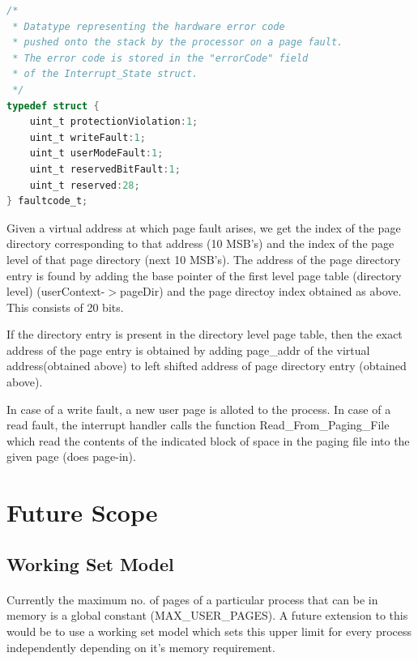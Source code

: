 \documentclass[11pt]{article}
\begin{document}
\begin{lstlisting}[language=c]
/*
 * Datatype representing the hardware error code
 * pushed onto the stack by the processor on a page fault.
 * The error code is stored in the "errorCode" field
 * of the Interrupt_State struct.
 */
typedef struct {
    uint_t protectionViolation:1;
    uint_t writeFault:1;
    uint_t userModeFault:1;
    uint_t reservedBitFault:1;
    uint_t reserved:28;
} faultcode_t;

\end{lstlisting}



Given a virtual address at which page fault arises, we get the index of the page directory corresponding to that address (10 MSB's) and the index of the page level of  that page directory (next 10 MSB's). The address of the page directory entry is found by adding the base pointer of the first level page table (directory level) (userContext-$>$pageDir) and the page directoy index obtained as above. This consists of 20 bits.

If the directory entry is present in the directory level page table, then the exact address of the page entry is obtained by adding page\_addr of the virtual address(obtained above) to left shifted address of page directory entry (obtained above). 

In case of a write fault, a new user page is alloted to the process. In case of a read fault, the interrupt handler calls the function Read\_From\_Paging\_File which read the contents of the indicated block of space in the paging file into the given page (does page-in).


\section{Future Scope}

\subsection{Working Set Model}
\paragraph{}
 Currently the maximum no. of pages of a particular process that can be in memory is a global constant (MAX\_USER\_PAGES). A future extension to this would be to use a working set model which sets this upper limit for every process independently depending on it's memory requirement.
\end{document}
